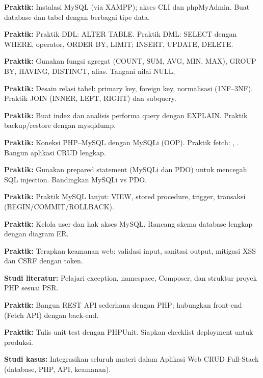 \documentclass[../main.tex]{subfiles}
\begin{document}
\begin{aktivitas}
  \item \textbf{Praktik:} Instalasi MySQL (via XAMPP); akses CLI dan phpMyAdmin. Buat database dan tabel dengan berbagai tipe data.
  \item \textbf{Praktik:} Praktik DDL: ALTER TABLE. Praktik DML: SELECT dengan WHERE, operator, ORDER BY, LIMIT; INSERT, UPDATE, DELETE.
  \item \textbf{Praktik:} Gunakan fungsi agregat (COUNT, SUM, AVG, MIN, MAX), GROUP BY, HAVING, DISTINCT, alias. Tangani nilai NULL.
  \item \textbf{Praktik:} Desain relasi tabel: primary key, foreign key, normalisasi (1NF--3NF). Praktik JOIN (INNER, LEFT, RIGHT) dan subquery.
  \item \textbf{Praktik:} Buat index dan analisis performa query dengan EXPLAIN. Praktik backup/restore dengan mysqldump.
  \item \textbf{Praktik:} Koneksi PHP--MySQL dengan MySQLi (OOP). Praktik fetch: , . Bangun aplikasi CRUD lengkap.
  \item \textbf{Praktik:} Gunakan prepared statement (MySQLi dan PDO) untuk mencegah SQL injection. Bandingkan MySQLi vs PDO.
  \item \textbf{Praktik:} Praktik MySQL lanjut: VIEW, stored procedure, trigger, transaksi (BEGIN/COMMIT/ROLLBACK).
  \item \textbf{Praktik:} Kelola user dan hak akses MySQL. Rancang skema database lengkap dengan diagram ER.
  \item \textbf{Praktik:} Terapkan keamanan web: validasi input, sanitasi output, mitigasi XSS dan CSRF dengan token.
  \item \textbf{Studi literatur:} Pelajari exception, namespace, Composer, dan struktur proyek PHP sesuai PSR.
  \item \textbf{Praktik:} Bangun REST API sederhana dengan PHP; hubungkan front-end (Fetch API) dengan back-end.
  \item \textbf{Praktik:} Tulis unit test dengan PHPUnit. Siapkan checklist deployment untuk produksi.
  \item \textbf{Studi kasus:} Integrasikan seluruh materi dalam Aplikasi Web CRUD Full-Stack (database, PHP, API, keamanan).
\end{aktivitas}
\end{document}
